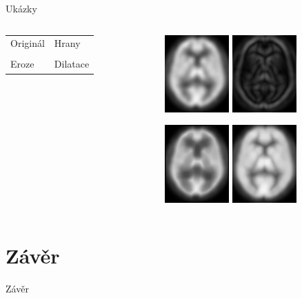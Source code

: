 \documentclass[compress,mathserif]{beamer}
\theoremstyle{definition}
\theoremstyle{plain}
\begin{document}
    \begin{frame}{Ukázky}
    
    \begin{columns}
    \begin{column}{0.3\textwidth}
        \begin{table}
          \begin{tabular}{ll}
            Originál \hfill & Hrany \hfill\\
            \vspace{2.5cm} & \\
            Eroze  & Dilatace \\
          \end{tabular}
        \end{table}
    \end{column} 
    
    \begin{column}{0.6\textwidth}  
    \begin{figure}
     \includegraphics[width = 70pt]{img/original.png}
             \hspace{10pt}
     \includegraphics[width = 70pt]{img/hrany.png}
    \end{figure}
    \vspace{-10pt}
    \begin{figure}
    \includegraphics[width = 70pt]{img/eroze.png}
         \hspace{10pt}
    \includegraphics[width = 70pt]{img/dilatace.png}
    \end{figure}
    \end{column}
    \end{columns}
        
    
    \end{frame}

\section{Závěr}
    \begin{frame}{Závěr}
      
    \end{frame}
\end{document}
